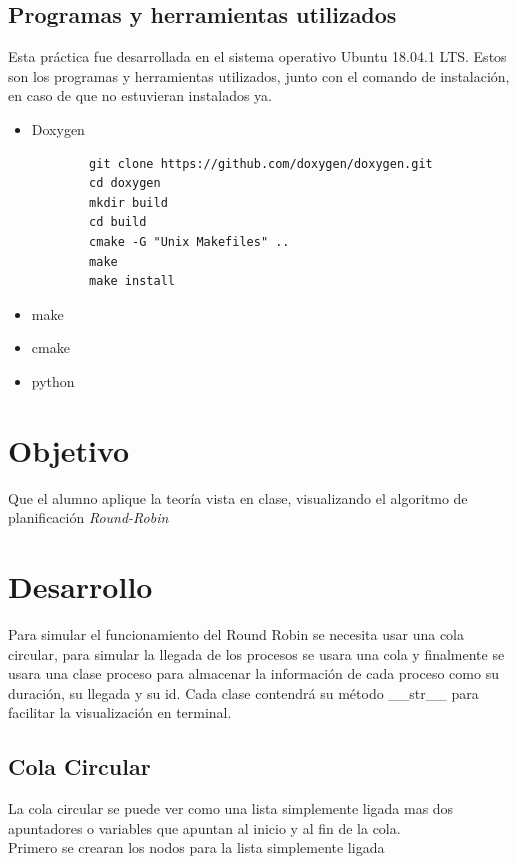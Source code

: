 \documentclass[12pt]{article}
\begin{document}
\subsection{Programas y herramientas utilizados}
Esta práctica fue desarrollada en el sistema operativo Ubuntu 18.04.1 LTS. Estos son los programas y herramientas utilizados, junto con el comando de instalación, en caso de que no estuvieran instalados ya. 
\begin{itemize}
    \item Doxygen 
    \begin{verbatim}
        git clone https://github.com/doxygen/doxygen.git
        cd doxygen
        mkdir build
        cd build
        cmake -G "Unix Makefiles" ..
        make
        make install
    \end{verbatim}
    \item make
    \item cmake
    \item python
\end{itemize}
\section{Objetivo}
Que el alumno aplique la teoría vista en clase, visualizando el algoritmo de planificación \emph{Round-Robin}
\section{Desarrollo}
Para simular el funcionamiento del Round Robin se necesita usar una cola circular, para simular la llegada de los procesos se usara una cola y finalmente se usara una clase proceso para almacenar la información de cada proceso como su duración, su llegada y su id. Cada clase contendrá su método \_\_str\_\_ para facilitar la visualización en terminal.\cite{str}
\subsection{Cola Circular}
La cola circular se puede ver como una lista simplemente ligada mas dos apuntadores o variables que apuntan al inicio y al fin de la cola.\\
Primero se crearan los nodos para la lista simplemente ligada
\end{document}
